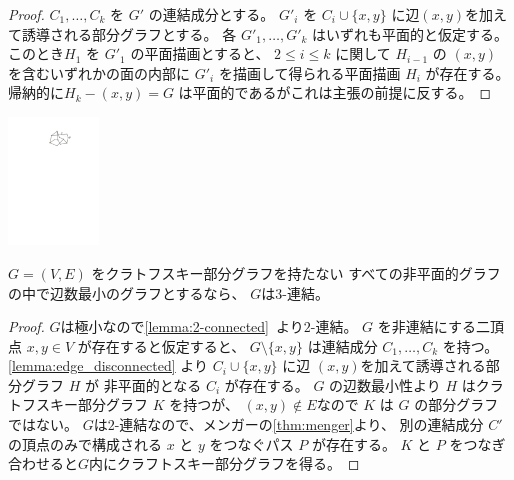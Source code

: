 \vspace*{-\intextsep}
\begin{paracol}{2}
\begin{proof}
$C_1, \ldots, C_k$ を $G'$ の連結成分とする。
$G'_i$ を $C_i \cup \{x, y\}$ に辺$(x,y)$を加えて誘導される部分グラフとする。
各 $G'_1, \ldots, G'_k$ はいずれも平面的と仮定する。
このとき$H_1$ を $G'_1$ の平面描画とすると、
$2 \leq i \leq k$ に関して $H_{i-1}$ の $(x, y)$ を含むいずれかの面の内部に
$G'_i$ を描画して得られる平面描画 $H_i$ が存在する。
帰納的に$H_k - (x, y)= G$ は平面的であるがこれは主張の前提に反する。
\end{proof}

\switchcolumn
\centering
\includegraphics[width=0.18\textwidth]{figures/kuratowski_subgraph_example_02.pdf}
\end{paracol}


\begin{lemma}\label{lemma:3_connectivity}
$G = (V, E)$ をクラトフスキー部分グラフを持たない
すべての非平面的グラフの中で辺数最小のグラフとするなら、
$G$は$3$-連結。
\end{lemma}

\begin{proof}
$G$は極小なので\cref{lemma:2-connected}~より$2$-連結。
$G$ を非連結にする二頂点 $x, y \in V$ が存在すると仮定すると、
$G\setminus \{x, y\}$ は連結成分 $C_1, \ldots, C_k$ を持つ。
\cref{lemma:edge_disconnected} より
$C_i \cup \{x, y\}$ に辺 $(x,y)$を加えて誘導される部分グラフ $H$ が
非平面的となる $C_i$ が存在する。
$G$ の辺数最小性より $H$ はクラトフスキー部分グラフ $K$ を持つが、
$(x, y) \notin E$なので $K$ は $G$ の部分グラフではない。
$G$は$2$-連結なので、メンガーの\cref{thm:menger}より、
別の連結成分 $C'$ の頂点のみで構成される $x$ と $y$ をつなぐパス $P$ が存在する。
$K$ と $P$ をつなぎ合わせると$G$内にクラフトスキー部分グラフを得る。
\end{proof}


